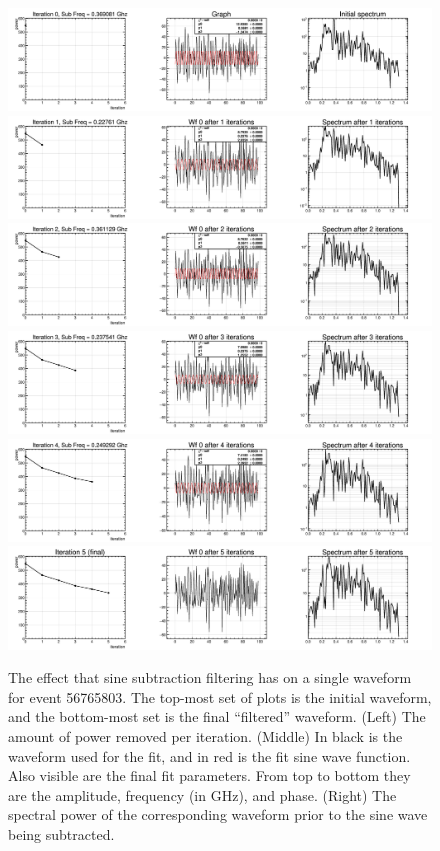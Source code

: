 \begin{figure}
	\centering
	\includegraphics[height=0.13\textheight]{figures/sineSubtract_0}		
	\includegraphics[height=0.13\textheight]{figures/sineSubtract_1}
	\includegraphics[height=0.13\textheight]{figures/sineSubtract_2}
	\includegraphics[height=0.13\textheight]{figures/sineSubtract_3}
	\includegraphics[height=0.13\textheight]{figures/sineSubtract_4}
	\includegraphics[height=0.13\textheight]{figures/sineSubtract_5}
	\caption{The effect that sine subtraction filtering has on a single waveform for event 56765803.  The top-most set of plots is the initial waveform, and the bottom-most set is the final ``filtered'' waveform. (Left) The amount of power removed per iteration.  (Middle) In black is the waveform used for the fit, and in red is the fit sine wave function.  Also visible are the final fit parameters.  From top to bottom they are the amplitude, frequency (in GHz), and phase.  (Right) The spectral power of the corresponding waveform prior to the sine wave being subtracted.} 
	\label{fig:SineSubtractExample}
\end{figure}

